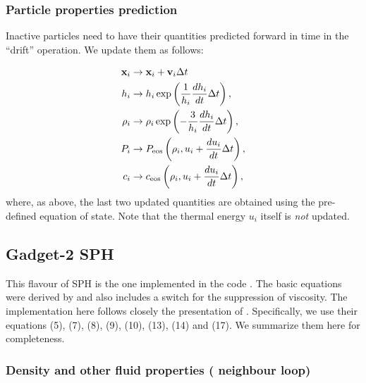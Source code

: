 \subsubsection{Particle properties prediction}

Inactive particles need to have their quantities predicted forward in
time in the ``drift'' operation. We update them as follows:

\begin{align}
  \vec{x}_i &\rightarrow \vec{x}_i + \vec{v}_i \Delta t  \label{eq:sph:minimal:drift_x} \\
  h_i &\rightarrow h_i \exp\left(\frac{1}{h_i} \frac{dh_i}{dt}
  \Delta t\right), \label{eq:sph:minimal:drift_h}\\
  \rho_i &\rightarrow \rho_i \exp\left(-\frac{3}{h_i} \frac{dh_i}{dt}
  \Delta t\right), \label{eq:sph:minimal:drift_rho} \\
  P_i &\rightarrow P_{\rm eos}\left(\rho_i, u_i + \frac{du_i}{dt} \Delta t\right), \label{eq:sph:minimal:drift_P}\\
  c_i &\rightarrow c_{\rm eos}\left(\rho_i, u_i + \frac{du_i}{dt}
  \Delta t\right) \label{eq:sph:minimal:drift_c},
\end{align}
where, as above, the last two updated quantities are obtained using
the pre-defined equation of state. Note that the thermal energy $u_i$
itself is \emph{not} updated.


\subsection{Gadget-2 SPH}
\label{sec:sph:gadget2}

This flavour of SPH is the one implemented in the  code
\citep{Springel2005}. The basic equations were derived by
\cite{Springel2002} and also includes a \cite{Balsara1995} switch for
the suppression of viscosity. The implementation here follows closely the
presentation of \cite{Springel2005}. Specifically, we use their equations (5), (7),
(8), (9), (10), (13), (14) and (17). We summarize them here for completeness.

\subsubsection{Density and other fluid properties ( neighbour loop)}

